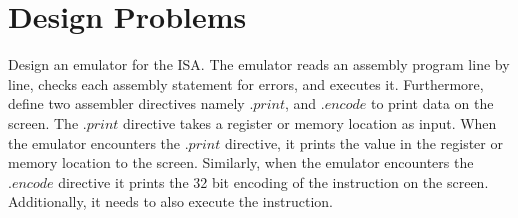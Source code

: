 \section*{Design Problems}
\begin{ExerciseList}
\Exercise

Design an emulator for the \simplerisc ISA. The emulator reads an assembly program line by line, checks each
assembly statement for errors, and executes it. 
Furthermore, define two assembler directives namely $.print$, and $.encode$ to print data on the screen.
The $.print$ directive takes a register or memory location as input. When the emulator encounters the $.print$
directive, it prints the value in the register or memory location to the screen. Similarly, when the emulator
encounters the $.encode$ directive it prints the 32 bit encoding of the instruction on the screen. Additionally,
it needs to also execute the instruction.

\end{ExerciseList}


























